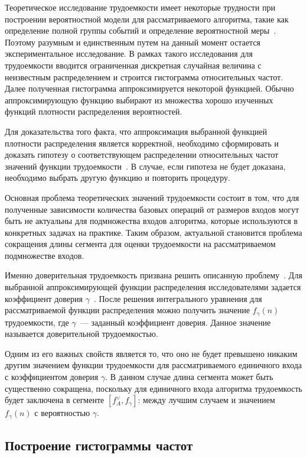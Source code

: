 \documentclass[a4paper, article, 14pt]{extarticle}
\begin{document}
Теоретическое исследование трудоемкости имеет некоторые трудности при построении вероятностной модели для рассматриваемого алгоритма, такие как определение полной группы событий и определение вероятностной меры~\cite{petrushyn_ulyanov_definitions}. Поэтому разумным и единственным путем на данный момент остается экспериментальное исследование. В рамках такого исследования для трудоемкости вводится ограниченная дискретная случайная величина с неизвестным распределением и строится гистограмма относительных частот. Далее полученная гистограмма аппроксимируется некоторой функцией. Обычно аппроксимирующую функцию выбирают из множества хорошо изученных функций плотности распределения вероятностей.

Для доказательства того факта, что аппроксимация выбранной функцией плотности распределения является корректной, необходимо сформировать и доказать гипотезу о соответствующем распределении относительных частот значений функции трудоемкости~\cite{petrushyn_ulyanov_planning}. В случае, если гипотеза не будет доказана, необходимо выбрать другую функцию и повторить процедуру.

Основная проблема теоретических значений трудоемкости состоит в том, что для полученные зависимости количества базовых операций от размеров входов могут быть не актуальны для подмножества входов алгоритма, которые используются в конкретных задачах на практике. Таким образом, актуальной становится проблема сокращения длины сегмента для оценки трудоемкости на рассматриваемом подмножестве входов.

Именно доверительная трудоемкость призвана решить описанную проблему~\cite{petrushyn_ulyanov_analysis}. Для выбранной аппроксимирующей функции распределения исследователями задается коэффициент доверия $\gamma$~\cite{gmurman}. После решения интегрального уравнения для рассматриваемой функции распределения можно получить значение $f_\gamma(n)$ трудоемкости, где $\gamma$~--- заданный коэффициент доверия. Данное значение называется доверительной трудоемкостью.

Одним из его важных свойств является то, что оно не будет превышено никаким другим значением функции трудоемкости для рассматриваемого единичного входа с коэффициентом доверия $\gamma$. В данном случае длина сегмента может быть существенно сокращена, поскольку для единичного входа алгоритма трудоемкость будет заключена в сегменте $[f_A^\vee, f_\gamma]$: между лучшим случаем и значением $f_\gamma(n)$ с вероятностью $\gamma$.

\subsection{Построение гистограммы частот}\label{sec:frequency_histogram}
\end{document}
